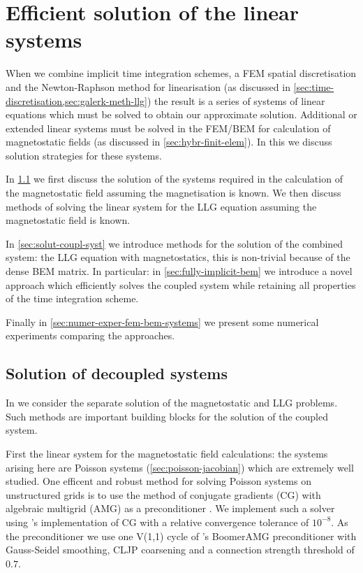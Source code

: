 \chapter{Efficient solution of the linear systems}
\label{sec:solution-strategies}

When we combine implicit time integration schemes, a FEM spatial discretisation and the Newton-Raphson method for linearisation (as discussed in \cref{sec:time-discretisation,sec:galerk-meth-llg}) the result is a series of systems of linear equations which must be solved to obtain our approximate solution.
Additional or extended linear systems must be solved in the FEM/BEM for calculation of magnetostatic fields (as discussed in \cref{sec:hybr-finit-elem}).
In this  we discuss solution strategies for these systems.

In \cref{sec:llg-only-system} we first discuss the solution of the systems required in the calculation of the magnetostatic field assuming the magnetisation is known.
We then discuss methods of solving the linear system for the LLG equation assuming the magnetostatic field is known.

In \cref{sec:solut-coupl-syst} we introduce methods for the solution of the combined system: the LLG equation with magnetostatics, this is non-trivial because of the dense BEM matrix.
In particular: in \cref{sec:fully-implicit-bem} we introduce a novel approach which efficiently solves the coupled system while retaining all properties of the time integration scheme.

Finally in \cref{sec:numer-exper-fem-bem-systems} we present some numerical experiments comparing the approaches.


\section{Solution of decoupled systems}
\label{sec:llg-only-system}

In  we consider the separate solution of the magnetostatic and LLG problems.
Such methods are important building blocks for the solution of the coupled system.

First the linear system for the magnetostatic field calculations: the systems arising here are Poisson systems (\cref{sec:poisson-jacobian}) which are extremely well studied.
One efficent and robust method for solving Poisson systems on unstructured grids is to use the method of conjugate gradients (CG) with algebraic multigrid (AMG) as a preconditioner \cite[Chap. 2]{HowardElmanDavidSilvester2006}.
We implement such a solver using \oomph's implementation of CG with a relative convergence tolerance of $10^{-8}$.
As the preconditioner we use one V(1,1) cycle of \hypre's BoomerAMG preconditioner \cite{hypre} with Gauss-Seidel smoothing, CLJP coarsening and a connection strength threshold of $0.7$.

